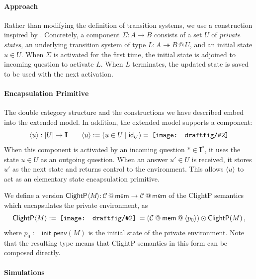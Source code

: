 \documentclass[acmsmall,screen,review,anonymous]{acmart}
\newcommand{\kw}[1]{\ensuremath{ \mathsf{#1} }}
\newcommand{\que}{\circ}
\newcommand{\draftfig}[2]{%
  \vcenter{\hbox{%
    \texttt{[image: draftfig/\#2]}%
  }}%
}
\begin{document}
\paragraph{Approach}

Rather than modifying the definition of transition systems,
we use a construction
inspired by \citet{feedback,caots}.
Concretely,
a component $\Sigma : A \rightarrow B$
consists of a set $U$ of \emph{private states},
an underlying transition system of type
$L : A \twoheadrightarrow B \mathbin@ U$,
and an initial state $u \in U$.
When $\Sigma$ is activated for the first time,
the initial state is adjoined to incoming question
to activate $L$.
When $L$ terminates,
the updated state is saved
to be used with the next activation.

\paragraph{Encapsulation Primitive}

The double category structure
and the constructions we have described
embed into the extended model.
In addition,
the extended model supports a component:
\[
  \langle u \rangle : [U] \rightarrow \mathbf{I}
  \qquad
  \langle u \rangle := (u \in U \mid \kw{id}_U)
  =\:
  \draftfig{0.1}{encap-prim}
\]
When this component is activated
by an incoming question $* \in \mathbf{I}^\que$,
it uses the state $u \in U$ as an outgoing question.
When an answer $u' \in U$ is received,
it stores $u'$ as the next state and returns control to the environment.
This allows $\langle u \rangle$ to act
as an elementary state encapsulation primitive.

\begin{example}
We define a version
$\kw{ClightP}\langle M \rangle :
    \mathcal{C} \mathbin@ \kw{mem} \rightarrow
    \mathcal{C} \mathbin@ \kw{mem}$
of the ClightP semantics
which encapsulates the private environment, as
\[
  \kw{ClightP} \langle M \rangle :=
  \:\draftfig{0.12}{encap-clightp}\: =
  (\mathcal{C} \mathbin@ \kw{mem} \mathbin@ \langle p_0 \rangle) \odot
    \kw{ClightP}(M)
  \,,
\]
where
$p_0 := \kw{init\_penv}(M)$
is the initial state of the private environment.
Note that the resulting type
means that ClightP semantics in this form
can be composed directly.
\end{example}

\paragraph{Simulations}
\end{document}
